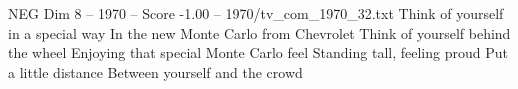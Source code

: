 \begin{textsample}{NEG Dim 8 – 1970 – Score -1.00 – 1970/tv\_com\_1970\_32.txt}  \label{ex:f8_neg_013}
Think of yourself in a special way In the new Monte Carlo from Chevrolet Think of yourself behind the wheel Enjoying that special Monte Carlo feel Standing tall, feeling proud Put a little distance Between yourself and the crowd

\end{textsample}
